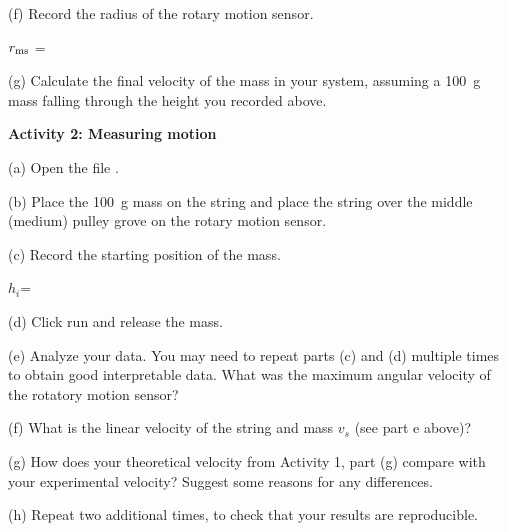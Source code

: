 (f) Record the radius of the rotary motion sensor.

\hspace{0.5in}$r_{\rm ms}$ =
\answerspace{3mm}

(g) Calculate the final velocity of the mass in your system, assuming a 100~g mass falling through the height you recorded above.
\answerspace{20mm}

\pagebreak

\textbf{Activity 2: Measuring motion}  

(a) Open the file . 

(b) Place the 100~g mass on the string and place the string over the middle (medium) pulley grove on the rotary motion sensor. 

(c) Record the starting position of the mass.
\answerspace{5mm}

\hspace{0.5in}$h_{i}$=
\answerspace{5mm}

(d) Click run and release the mass.

(e) Analyze your data. You may need to repeat parts (c) and (d) multiple times to obtain good interpretable data.
What was the maximum angular velocity of the rotatory motion sensor?
\answerspace{20mm} 

(f) What is the linear velocity of the string and mass $v_{s}$ (see part e above)?
\answerspace{10mm} 


(g) How does your theoretical velocity from Activity 1, part (g) compare with your experimental velocity?  Suggest some reasons for any differences.

(h) Repeat two additional times, to check that your results are reproducible.
\answerspace{20mm} 

